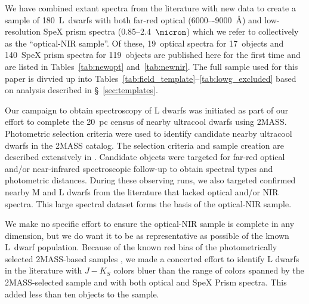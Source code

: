 \documentclass[12pt,preprint]{aastex}
\newcommand{\sample}{180}
\newcommand{\NewOptSpectra}{19} %
\newcommand{\NewOptObjects}{17} %
\newcommand{\NewPrismSpectra}{140} %
\newcommand{\NewPrismObjects}{119} %
\begin{document}
We have combined extant spectra from the literature with new data to create a sample of \sample~L~dwarfs with both far-red optical (6000–-9000~\AA) and low-resolution SpeX prism spectra (0.85--2.4~$\micron$) which we refer to collectively as the ``optical-NIR sample''. 
Of these, \NewOptSpectra~optical spectra for \NewOptObjects~objects and \NewPrismSpectra~SpeX prism spectra for \NewPrismObjects~objects are published here for the first time and are listed in Tables~\ref{tab:newopt} and~\ref{tab:newnir}. 
The full sample used for this paper is divvied up into Tables~\ref{tab:field_template}--\ref{tab:lowg_excluded} based on analysis described in \S~\ref{sec:templates}.

Our campaign to obtain spectroscopy of L dwarfs was initiated as part of our effort to complete the 20~pc census of nearby ultracool dwarfs using 2MASS. 
Photometric selection criteria were used to identify candidate nearby ultracool dwarfs in the 2MASS catalog. 
The selection criteria and sample creation are described extensively in \cite[Papers~III, V, and IX]{Cruz03,Cruz07,Reid08}. 
Candidate objects were targeted for far-red optical and/or near-infrared spectroscopic follow-up to obtain spectral types and photometric distances. 
During these observing runs, we also targeted confirmed nearby M and L dwarfs from the literature that lacked optical and/or NIR spectra.
This large spectral dataset forms the basis of the optical-NIR sample.

We make no specific effort to ensure the optical-NIR sample is complete in any dimension, but we do want it to be as representative as possible of the known L~dwarf population.
Because of the known red bias of the photometrically selected 2MASS-based samples \cite[Figure 3]{Schmidt10}, we made a concerted effort to identify L dwarfs in the literature with $J-K_S$ colors bluer than the range of colors spanned by the 2MASS-selected sample and with both optical and SpeX Prism spectra. 
This added less than ten objects to the sample.
\end{document}
